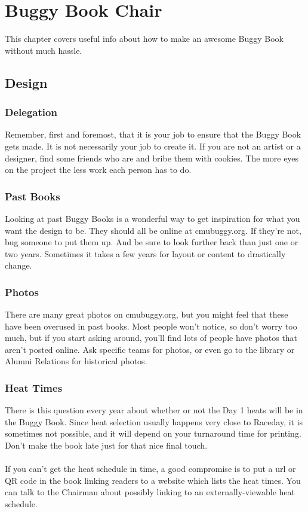 \chapter{Buggy Book Chair}
\label{ch:Buggy Book}
This chapter covers useful info about how to make an awesome Buggy Book
without much hassle.

\section{Design}
\subsection{Delegation}
Remember, first and foremost, that it is your job to ensure that the Buggy
Book gets made. It is not necessarily your job to create it. If you are not
an artist or a designer, find some friends who are and bribe them with cookies.
The more eyes on the project the less work each person has to do.

\subsection{Past Books}
Looking at past Buggy Books is a wonderful way to get inspiration for what you
want the design to be. They should all be online at cmubuggy.org. If they're
not, bug someone to put them up. And be sure to look further back than just
one or two years. Sometimes it takes a few years for layout or content to
drastically change.

\subsection{Photos}
There are many great photos on cmubuggy.org, but you might feel that these have
been overused in past books. Most people won't notice, so don't worry too
much, but if you start asking around, you'll find lots of people have photos
that aren't posted online. Ask specific teams for photos, or even go to
the library or Alumni Relations for historical photos.

\subsection{Heat Times}
There is this question every year about whether or not the Day 1 heats will
be in the Buggy Book. Since heat selection usually happens very close to
Raceday, it is sometimes not possible, and it will depend on your turnaround
time for printing. Don't make the book late just for that nice final touch.
\\\\
If you can't get the heat schedule in time, a good compromise is to put a
url or QR code in the book linking readers to a website which lists the heat
times. You can talk to the Chairman about possibly linking to an externally-viewable
heat schedule.

